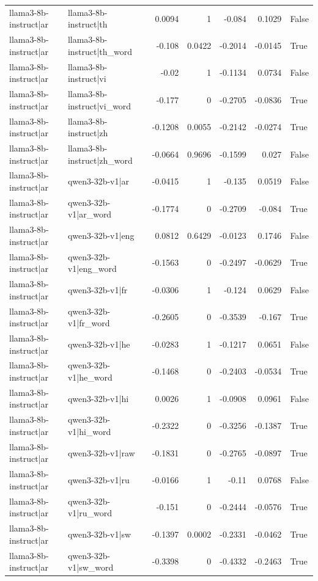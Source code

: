 \begin{table}
\begin{tabular}{l l r r r r l}
llama3-8b-instruct|ar & llama3-8b-instruct|th & 0.0094 & 1 & -0.084 & 0.1029 & False \\
llama3-8b-instruct|ar & llama3-8b-instruct|th_word & -0.108 & 0.0422 & -0.2014 & -0.0145 & True \\
llama3-8b-instruct|ar & llama3-8b-instruct|vi & -0.02 & 1 & -0.1134 & 0.0734 & False \\
llama3-8b-instruct|ar & llama3-8b-instruct|vi_word & -0.177 & 0 & -0.2705 & -0.0836 & True \\
llama3-8b-instruct|ar & llama3-8b-instruct|zh & -0.1208 & 0.0055 & -0.2142 & -0.0274 & True \\
llama3-8b-instruct|ar & llama3-8b-instruct|zh_word & -0.0664 & 0.9696 & -0.1599 & 0.027 & False \\
llama3-8b-instruct|ar & qwen3-32b-v1|ar & -0.0415 & 1 & -0.135 & 0.0519 & False \\
llama3-8b-instruct|ar & qwen3-32b-v1|ar_word & -0.1774 & 0 & -0.2709 & -0.084 & True \\
llama3-8b-instruct|ar & qwen3-32b-v1|eng & 0.0812 & 0.6429 & -0.0123 & 0.1746 & False \\
llama3-8b-instruct|ar & qwen3-32b-v1|eng_word & -0.1563 & 0 & -0.2497 & -0.0629 & True \\
llama3-8b-instruct|ar & qwen3-32b-v1|fr & -0.0306 & 1 & -0.124 & 0.0629 & False \\
llama3-8b-instruct|ar & qwen3-32b-v1|fr_word & -0.2605 & 0 & -0.3539 & -0.167 & True \\
llama3-8b-instruct|ar & qwen3-32b-v1|he & -0.0283 & 1 & -0.1217 & 0.0651 & False \\
llama3-8b-instruct|ar & qwen3-32b-v1|he_word & -0.1468 & 0 & -0.2403 & -0.0534 & True \\
llama3-8b-instruct|ar & qwen3-32b-v1|hi & 0.0026 & 1 & -0.0908 & 0.0961 & False \\
llama3-8b-instruct|ar & qwen3-32b-v1|hi_word & -0.2322 & 0 & -0.3256 & -0.1387 & True \\
llama3-8b-instruct|ar & qwen3-32b-v1|raw & -0.1831 & 0 & -0.2765 & -0.0897 & True \\
llama3-8b-instruct|ar & qwen3-32b-v1|ru & -0.0166 & 1 & -0.11 & 0.0768 & False \\
llama3-8b-instruct|ar & qwen3-32b-v1|ru_word & -0.151 & 0 & -0.2444 & -0.0576 & True \\
llama3-8b-instruct|ar & qwen3-32b-v1|sw & -0.1397 & 0.0002 & -0.2331 & -0.0462 & True \\
llama3-8b-instruct|ar & qwen3-32b-v1|sw_word & -0.3398 & 0 & -0.4332 & -0.2463 & True \\

\end{tabular}
\end{table}
